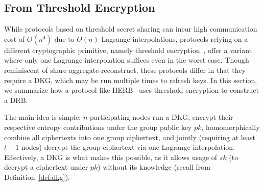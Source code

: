 \subsection{From Threshold Encryption}
While protocols based on threshold secret sharing can incur high communication cost of $O(n^4)$ due to $O(n)$ Lagrange interpolations, protocols relying on a different cryptographic primitive, namely threshold encryption~\cite{desmedt1990Threshold}, offer a variant where only one Lagrange interpolation suffices even in the worst case. Though reminiscent of share-aggregate-reconstruct, these protocols differ in that they require a DKG, which may be run multiple times to refresh keys. In this section, we summarize how a protocol like HERB~\cite{cherniaeva2019homomorphic} uses threshold encryption to construct a DRB.

The main idea is simple: $n$ participating nodes run a DKG, encrypt their respective entropy contributions under the group public key $pk$, homomorphically combine all ciphertexts into one group ciphertext, and jointly (requiring at least $t + 1$ nodes) decrypt the group ciphertext via one Lagrange interpolation. Effectively, a DKG is what makes this possible, as it allows usage of $sk$ (to decrypt a ciphertext under $pk$) without its knowledge (recall from Definition~\ref{def:dkg}).


